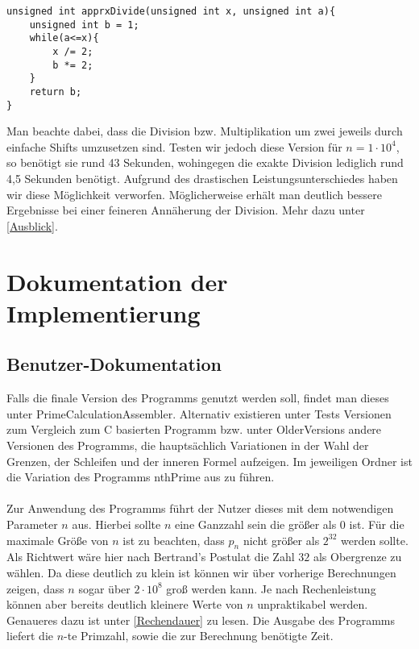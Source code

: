 \documentclass[11pt]{scrartcl}
\begin{document}
\begin{lstlisting}[frame=single, captionpos=b, label=code-comm-task, xleftmargin=.03\textwidth]
unsigned int apprxDivide(unsigned int x, unsigned int a){
    unsigned int b = 1;
    while(a<=x){
        x /= 2;
        b *= 2;
    }
    return b;
}
\end{lstlisting}
Man beachte dabei, dass die Division bzw. Multiplikation um zwei jeweils durch einfache Shifts umzusetzen sind. Testen wir jedoch diese Version für $n= 1 \cdot 10^4$, so benötigt sie rund 43 Sekunden, wohingegen die exakte Division lediglich rund 4,5 Sekunden benötigt. Aufgrund des drastischen Leistungsunterschiedes haben wir diese Möglichkeit verworfen. Möglicherweise erhält man deutlich bessere Ergebnisse bei einer feineren Annäherung der Division. Mehr dazu unter \ref{Ausblick}.

\section{Dokumentation der Implementierung}

\subsection{Benutzer-Dokumentation}
Falls die finale Version des Programms genutzt werden soll, findet man dieses unter PrimeCalculationAssembler. Alternativ existieren unter Tests Versionen zum Vergleich zum C basierten Programm bzw. unter OlderVersions  andere Versionen des Programms, die hauptsächlich Variationen in der Wahl der Grenzen, der Schleifen und der inneren Formel aufzeigen. Im jeweiligen Ordner ist die Variation des Programms nthPrime aus zu führen.

\paragraph{}

Zur Anwendung des Programms führt der Nutzer dieses mit dem notwendigen Parameter $n$ aus. Hierbei sollte $n$ eine Ganzzahl sein die größer als $0$ ist. Für die maximale Größe von $n$ ist zu beachten, dass $p_n$ nicht größer als $2^{32}$ werden sollte. Als Richtwert wäre hier nach Bertrand's Postulat\cite{bertrands_postulate} die Zahl $32$ als Obergrenze zu wählen. Da diese deutlich zu klein ist können wir über vorherige Berechnungen zeigen, dass $n$ sogar über $2\cdot10^8$ groß werden kann. Je nach Rechenleistung können aber bereits deutlich kleinere Werte von $n$ unpraktikabel werden. Genaueres dazu ist unter \ref{Rechendauer} zu lesen. Die Ausgabe des Programms liefert die $n$-te Primzahl, sowie die zur Berechnung benötigte Zeit.
\end{document}
